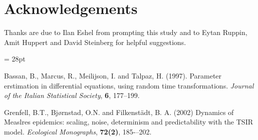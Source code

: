 \documentclass{article}
\begin{document}
\newpage

\section*{Acknowledgements}

Thanks are due to Ilan Eshel from prompting this study and to Eytan Ruppin, Amit Huppert and David Steinberg for helpful suggestions.

\baselineskip= 28pt

\begin{thebibliography}{99}

 Bassan, B., Marcus, R., Meilijson, I. and Talpaz, H. (1997). Parameter erstimation in differential equations, using random time transformations. {\em Journal of the Italian Statistical Society}, {\bf 6}, 177--199.

 Grenfell, B.T., Bj{\o}rnstad, O.N. and Filkenst\"{a}dt, B. A. (2002) Dynamics of Measlres epidemics: scaling, noise, determinism and predictability with the TSIR model. {\em Ecological Monographs}, {\bf 72(2)}, 185-–202.

	
\end{thebibliography}
\end{document}
